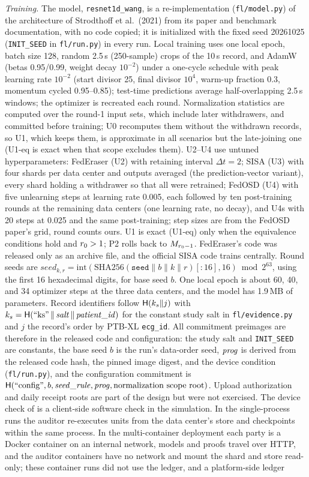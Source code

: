 \emph{Training.} The model, \texttt{resnet1d\_wang}, is a re-implementation (\texttt{fl/model.py}) of the architecture of Strodthoff et al.\ (2021) from its paper and benchmark documentation, with no code copied; it is initialized with the fixed seed 20261025 (\texttt{INIT\_SEED} in \texttt{fl/run.py}) in every run. Local training uses one local epoch, batch size 128, random 2.5\,s (250-sample) crops of the 10\,s record, and AdamW (betas 0.95/0.99, weight decay $10^{-2}$) under a one-cycle schedule with peak learning rate $10^{-2}$ (start divisor 25, final divisor $10^{4}$, warm-up fraction 0.3, momentum cycled 0.95--0.85); test-time predictions average half-overlapping 2.5\,s windows; the optimizer is recreated each round. Normalization statistics are computed over the round-1 input sets, which include later withdrawers, and committed before training; U0 recomputes them without the withdrawn records, so U1, which keeps them, is approximate in all scenarios but the late-joining one (U1-eq is exact when that scope excludes them). U2--U4 use untuned hyperparameters: FedEraser (U2) with retaining interval $\Delta t=2$; SISA (U3) with four shards per data center and outputs averaged (the prediction-vector variant), every shard holding a withdrawer so that all were retrained; FedOSD (U4) with five unlearning steps at learning rate 0.005, each followed by ten post-training rounds at the remaining data centers (one learning rate, no decay), and U4s with 20 steps at 0.025 and the same post-training; step sizes are from the FedOSD paper's grid, round counts ours. U1 is exact (U1-eq) only when the equivalence conditions hold and $r_0>1$; P2 rolls back to $M_{r_0-1}$. FedEraser's code was released only as an archive file, and the official SISA code trains centrally. Round seeds are $\mathit{seed}_{k,r}=\mathrm{int}(\mathrm{SHA256}(\texttt{seed}\|b\|k\|r)[{:}16],16)\bmod 2^{63}$, using the first 16 hexadecimal digits, for base seed $b$. One local epoch is about 60, 40, and 34 optimizer steps at the three data centers, and the model has 1.9\,MB of parameters. Record identifiers follow $\mathsf{H}(k_s\|j)$ with $k_s=\mathsf{H}(\text{``ks''}\,\|\,\mathit{salt}\,\|\,\mathit{patient\_id})$ for the constant study salt in \texttt{fl/evidence.py} and $j$ the record's order by PTB-XL \texttt{ecg\_id}. All commitment preimages are therefore in the released code and configuration: the study salt and \texttt{INIT\_SEED} are constants, the base seed $b$ is the run's data-order seed, $\mathit{prog}$ is derived from the released code hash, the pinned image digest, and the device condition (\texttt{fl/run.py}), and the configuration commitment is $\mathsf{H}(\text{``config''}, b, \mathit{seed\_rule}, \mathit{prog}, \text{normalization scope root})$. Upload authorization and daily receipt roots are part of the design but were not exercised. The device check of \Lfour{} is a client-side software check in the simulation. In the single-process runs the auditor re-executes units from the data center's store and checkpoints within the same process. In the multi-container deployment each party is a Docker container on an internal network, models and proofs travel over HTTP, and the auditor containers have no network and mount the shard and store read-only; these container runs did not use the ledger, and a platform-side ledger 